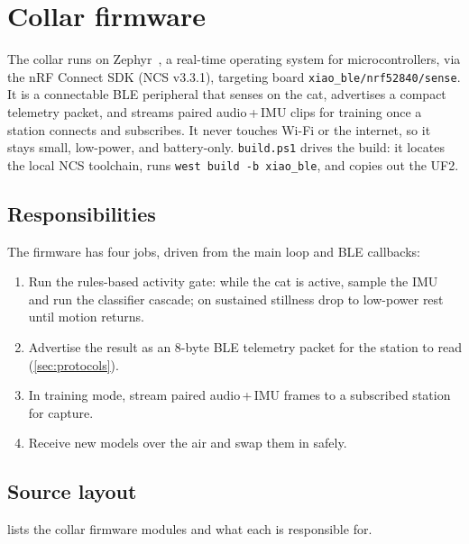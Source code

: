 \section{Collar firmware}
\label{sec:firmware-collar}

The collar runs on Zephyr~\cite{zephyr}, a real-time operating system for microcontrollers, via the
nRF Connect SDK (NCS v3.3.1), targeting board
\texttt{xiao\_ble/nrf52840/sense}. It is a connectable BLE peripheral that senses on the cat,
advertises a compact telemetry packet, and streams paired audio\,+\,IMU clips for training once a
station connects and subscribes. It never touches Wi-Fi or the internet, so it stays small, low-power,
and battery-only. \texttt{build.ps1} drives the build: it locates the local NCS toolchain, runs
\texttt{west build -b xiao\_ble}, and copies out the UF2.

\subsection{Responsibilities}

The firmware has four jobs, driven from the main loop and BLE callbacks:
\begin{enumerate}[leftmargin=1.6em,itemsep=2pt]
  \item Run the rules-based activity gate: while the cat is active, sample the IMU and run the
        classifier cascade; on sustained stillness drop to low-power rest until motion returns.
  \item Advertise the result as an 8-byte BLE telemetry packet for the station to read
        (\cref{sec:protocols}).
  \item In training mode, stream paired audio\,+\,IMU frames to a subscribed station for capture.
  \item Receive new models over the air and swap them in safely.
\end{enumerate}

\subsection{Source layout}

 lists the collar firmware modules and what each is responsible for.

